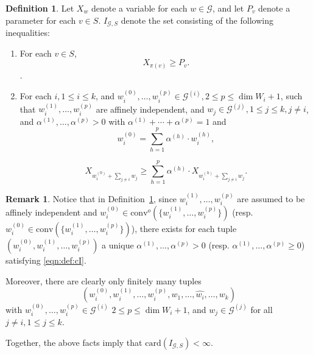 \documentclass[10pt]{amsart}
\theoremstyle{plain}
\theoremstyle{definition}
\newtheorem{definition}[lemma]{Definition}
\newtheorem{remark}[lemma]{Remark}
\providecommand{\cG}[0]{\ensuremath{\mathcal G}\xspace}
\let\leq\leqslant
\let\geq\geqslant
\providecommand{\conv}[1]{\ensuremath{\mathrm{conv}{\left({#1}\right)}\xspace}}
\providecommand{\convo}[1]{\ensuremath{\mathrm{conv}^o{\left({#1}\right)}\xspace}}
\providecommand{\card}[0]{\ensuremath{\mathrm{card}}\xspace}
\begin{document}
\begin{definition}
\label{def:cI}
    Let $X_w$ denote a variable for each $w \in \mathcal{G}$, and let $P_v$ denote a parameter for each $v \in S$.  $I_{\cG,S}$ denote 
    the set consisting of the following inequalities:
    \begin{enumerate}
        \item For each $v \in S$, 
        \begin{equation}
        \label{eqn:I.1}
            X_{\pi(v)} \geq P_v.
        \end{equation}.
        \item For each $i, 1 \leq i \leq k$, and 
        $w_{i}^{(0)}, \ldots, w_{i}^{(p)} \in  \cG^{(i)}, 2 \leq p \leq \dim W_i+1$, 
        such that $w_{i}^{(1)},\ldots,w_{i}^{(p)}$ are affinely independent,
        and $w_j \in \cG^{(j)}, 1 \leq j \leq k, j \neq i$, 
        and $\alpha^{(1)},\ldots,\alpha^{(p)} > 0$ with
        $\alpha^{(1)}+\cdots+\alpha^{(p)}= 1$ and 
        \begin{equation}
        \label{eqn:def:cI}
         w_{i}^{(0)} = \sum_{h=1}^{p} \alpha^{(h)} \cdot w_{i}^{(h)},    
        \end{equation}
         
        \begin{equation}
        \label{eqn:I.2}
        X_{w_{i}^{(0)}+\sum_{j\neq i} w_j} \geq \sum_{h=1}^{p} \alpha^{(h)} \cdot X_{w_{i}^{(h)}+\sum_{j\neq i} w_j}.
        \end{equation}
    \end{enumerate}
\end{definition}

\begin{remark}
    Notice that in Definition~\ref{def:cI}, since $w_{i}^{(1)},\ldots,w_{i}^{(p)}$ 
    are assumed to be affinely independent and 
    $
    w_{i}^{(0)} \in \convo{\{w_{i}^{(1)},\ldots,w_{i}^{(p)}\}}
    $
    (resp. 
    $
    w_{i}^{(0)} \in \conv{\{w_{i}^{(1)},\ldots,w_{i}^{(p)}\}}
    $),
    there exists for each tuple
    $(w_{i}^{(0)},w_{i}^{(1)},\ldots,w_{i}^{(p)})$
    a unique $\alpha^{(1)},\ldots,\alpha^{(p)} > 0$ 
    (resp. $\alpha^{(1)},\ldots,\alpha^{(p)} \geq 0$)
    satisfying
    \eqref{eqn:def:cI}.
    
    Moreover, there are clearly only finitely many tuples
    \[
    (w_{i}^{(0)},w_{i}^{(1)},\ldots,w_{i}^{(p)}, w_1,\ldots,\widehat{w_i},\ldots,w_k)
    \]
    with $w_{i}^{(0)}, \ldots,w_{i}^{(p)} \in \cG^{(i)}$ $2 \leq p \leq \dim W_i+1$, and
    $w_j \in \cG^{(j)}$ for all $j \neq i, 1 \leq j \leq k$.
    
    Together, the above facts imply that $\card(I_{\cG,S}) < \infty$.
\end{remark}
\end{document}
